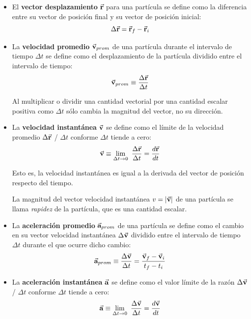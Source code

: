     \begin{itemize}
      \item El \textbf{vector desplazamiento} $\vec{\mathbf{r}}$ para una partícula se define como la diferencia entre su vector
      de posición final y su vector de posición inicial:
        \begin{equation*}
          \Delta \vec{\mathbf{r}} = \vec{\mathbf{r}}_{f} - \vec{\mathbf{r}}_{i}
        \end{equation*}

      \item La \textbf{velocidad promedio} $\vec{\mathbf{v}}_{prom}$ de una partícula durante el intervalo de tiempo $\Delta t$ se
      define como el desplazamiento de la partícula dividido entre el intervalo de tiempo:
        \begin{equation*}
          \vec{\mathbf{v}}_{prom} \equiv \frac{\Delta \vec{\mathbf{r}}}{\Delta t}
        \end{equation*}

        \PN Al multiplicar o dividir una cantidad vectorial por una cantidad escalar positiva como $\Delta t$ sólo
        cambia la magnitud del vector, no su dirección.

      \item La \textbf{velocidad instantánea} $\vec{\mathbf{v}}$ se define como el límite de la velocidad promedio $\Delta \vec{\mathbf{r}}$
      / $\Delta t$ conforme $\Delta t$ tiende a cero:
        \begin{equation*}
          \vec{\mathbf{v}} \equiv \lim_{\Delta t \rightarrow 0} \ \frac{\Delta \vec{\mathbf{r}}}{\Delta t} = \frac{d \vec{\mathbf{r}}}{dt}
        \end{equation*}

        \PN Esto es, la velocidad instantánea es igual a la derivada del vector de posición respecto del tiempo.

        \PN La magnitud del vector velocidad instantánea $ v = \lvert\vec{\mathbf{v}}\rvert$ de una partícula se llama \textit{rapidez}
        de la partícula, que es una cantidad escalar.

      \item La \textbf{aceleración promedio} $\vec{\mathbf{a}}_{prom}$ de una partícula se define como el cambio en su vector
      velocidad instantánea $\Delta \vec{\mathbf{v}}$ dividido entre el intervalo de tiempo $\Delta t$ durante el que ocurre dicho
      cambio:
        \begin{equation*}
          \vec{\mathbf{a}}_{prom} \equiv \frac{\Delta \vec{\mathbf{v}}}{\Delta t} = \frac{\vec{\mathbf{v}}_{f} - \vec{\mathbf{v}}_{i}}{t_{f} - t_{i}}
        \end{equation*}

      \item La \textbf{aceleración instantánea} $\vec{\mathbf{a}}$ se define como el valor límite de la razón $\Delta \vec{\mathbf{v}}$ /
      $\Delta t$ conforme $\Delta t$ tiende a cero:
        \begin{equation*}
          \vec{\mathbf{a}} \equiv \lim_{\Delta t \rightarrow 0} \ \frac{\Delta \vec{\mathbf{v}}}{\Delta t} = \frac{d \vec{\mathbf{v}}}{dt}
        \end{equation*}
    \end{itemize}


